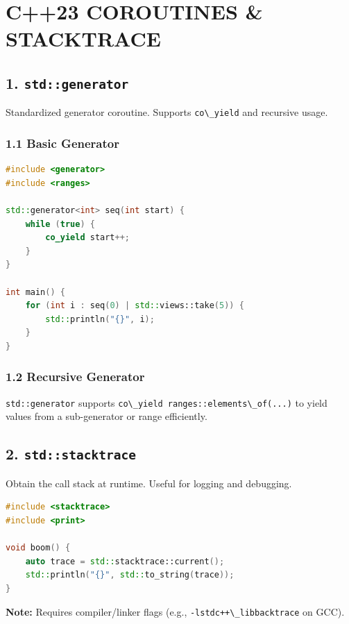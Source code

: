 \hypertarget{c23-coroutines-stacktrace}{%
\chapter{C++23 COROUTINES \&
STACKTRACE}\label{c23-coroutines-stacktrace}}

\hypertarget{stdgenerator}{%
\section{\texorpdfstring{1.
\texttt{std::generator}}{1. std::generator}}\label{stdgenerator}}

Standardized generator coroutine. Supports
\passthrough{\lstinline!co\_yield!} and recursive usage.

\hypertarget{basic-generator}{%
\subsection{1.1 Basic Generator}\label{basic-generator}}

\begin{lstlisting}[language={C++}]
#include <generator>
#include <ranges>

std::generator<int> seq(int start) {
    while (true) {
        co_yield start++;
    }
}

int main() {
    for (int i : seq(0) | std::views::take(5)) {
        std::println("{}", i);
    }
}
\end{lstlisting}

\hypertarget{recursive-generator}{%
\subsection{1.2 Recursive Generator}\label{recursive-generator}}

\passthrough{\lstinline!std::generator!} supports
\passthrough{\lstinline!co\_yield ranges::elements\_of(...)!} to yield
values from a sub-generator or range efficiently.

\hypertarget{stdstacktrace}{%
\section{\texorpdfstring{2.
\texttt{std::stacktrace}}{2. std::stacktrace}}\label{stdstacktrace}}

Obtain the call stack at runtime. Useful for logging and debugging.

\begin{lstlisting}[language={C++}]
#include <stacktrace>
#include <print>

void boom() {
    auto trace = std::stacktrace::current();
    std::println("{}", std::to_string(trace));
}
\end{lstlisting}

\textbf{Note:} Requires compiler/linker flags (e.g.,
\passthrough{\lstinline!-lstdc++\_libbacktrace!} on GCC).
